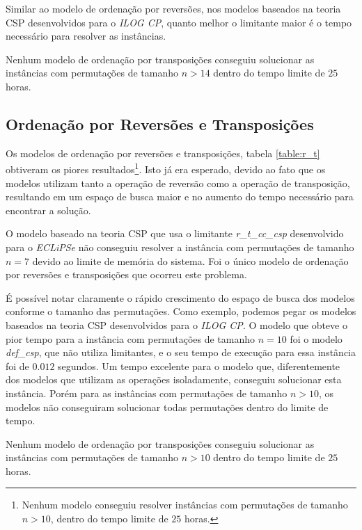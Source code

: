 Similar ao modelo de ordenação por reversões, nos modelos baseados na
teoria CSP desenvolvidos para o \textit{ILOG CP}, quanto melhor o
limitante maior é o tempo necessário para resolver as instâncias.

Nenhum modelo de ordenação por transposições conseguiu solucionar as
instâncias com permutações de tamanho $n > 14$ dentro do tempo limite
de $25$ horas.



\subsection{Ordenação por Reversões e Transposições}
\label{subsec:analise_r_t}
Os modelos de ordenação por reversões e transposições,
tabela \ref{table:r_t} obtiveram os piores resultados\footnote{Nenhum
modelo conseguiu resolver instâncias com permutações de tamanho $n >
10$, dentro do tempo limite de $25$ horas.}. Isto já era esperado,
devido ao fato que os modelos utilizam tanto a operação de reversão
como a operação de transposição, resultando em um espaço de busca
maior e no aumento do tempo necessário para encontrar a solução.

O modelo baseado na teoria CSP que usa o
limitante \textit{r\_t\_cc\_csp} desenvolvido para o \textit{ECLiPSe}
não conseguiu resolver a instância com permutações de tamanho $n = 7$
devido ao limite de memória do sistema. Foi o único modelo de
ordenação por reversões e transposições que ocorreu este problema.

É possível notar claramente o rápido crescimento do espaço de busca
dos modelos conforme o tamanho das permutações. Como exemplo, podemos
pegar os modelos baseados na teoria CSP desenvolvidos para
o \textit{ILOG CP}. O modelo que obteve o pior tempo para a instância
com permutações de tamanho $n = 10$ foi o modelo \textit{def\_csp},
que não utiliza limitantes, e o seu tempo de execução para essa
instância foi de $0.012$ segundos. Um tempo excelente para o modelo
que, diferentemente dos modelos que utilizam as operações
isoladamente, conseguiu solucionar esta instância. Porém para as
instâncias com permutações de tamanho $n > 10$, os modelos não
conseguiram solucionar todas permutações dentro do limite de tempo.

Nenhum modelo de ordenação por transposições conseguiu solucionar as
instâncias com permutações de tamanho $n > 10$ dentro do tempo limite
de $25$ horas.



